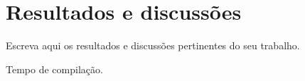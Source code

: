 \chapter{Resultados e discussões}

Escreva aqui os resultados e discussões pertinentes do seu trabalho.

\begin{table}
	\caption{Tempo de compilação.}
	\label{tab:time}
\end{table}
